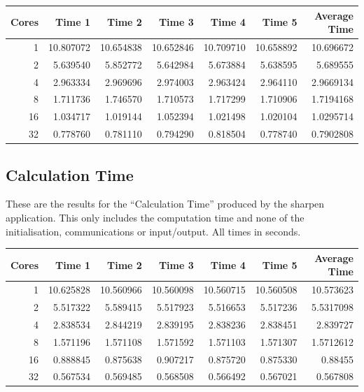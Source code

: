 \documentclass{article}
\begin{document}
\begin{center}
\begin{tabular}{rrrrrrr}
 Cores  &     Time 1  &     Time 2  &     Time 3  &     Time 4  &     Time 5  &  Average Time  \\
\hline
     1  &  10.807072  &  10.654838  &  10.652846  &  10.709710  &  10.658892  &     10.696672  \\
     2  &   5.639540  &   5.852772  &   5.642984  &   5.673884  &   5.638595  &      5.689555  \\
     4  &   2.963334  &   2.969696  &   2.974003  &   2.963424  &   2.964110  &     2.9669134  \\
     8  &   1.711736  &   1.746570  &   1.710573  &   1.717299  &   1.710906  &     1.7194168  \\
    16  &   1.034717  &   1.019144  &   1.052394  &   1.021498  &   1.020104  &     1.0295714  \\
    32  &   0.778760  &   0.781110  &   0.794290  &   0.818504  &   0.778740  &     0.7902808  \\
\end{tabular}
\end{center}



\subsection{Calculation Time}
\label{sec-2.2}


These are the results for the ``Calculation Time'' produced by the
sharpen application. This only includes the computation time and none
of the initialisation, communications or input/output. All times in seconds.



\begin{center}
\begin{tabular}{rrrrrrr}
 Cores  &     Time 1  &     Time 2  &     Time 3  &     Time 4  &     Time 5  &  Average Time  \\
\hline
     1  &  10.625828  &  10.560966  &  10.560098  &  10.560715  &  10.560508  &     10.573623  \\
     2  &   5.517322  &   5.589415  &   5.517923  &   5.516653  &   5.517236  &     5.5317098  \\
     4  &   2.838534  &   2.844219  &   2.839195  &   2.838236  &   2.838451  &      2.839727  \\
     8  &   1.571196  &   1.571108  &   1.571592  &   1.571103  &   1.571307  &     1.5712612  \\
    16  &   0.888845  &   0.875638  &   0.907217  &   0.875720  &   0.875330  &       0.88455  \\
    32  &   0.567534  &   0.569485  &   0.568508  &   0.566492  &   0.567021  &      0.567808  \\
\end{tabular}
\end{center}
\end{document}
